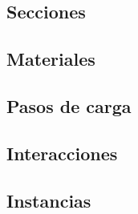 \subsection{Secciones}

\subsection{Materiales}

\subsection{Pasos de carga}

\subsection{Interacciones}

\subsection{Instancias}
